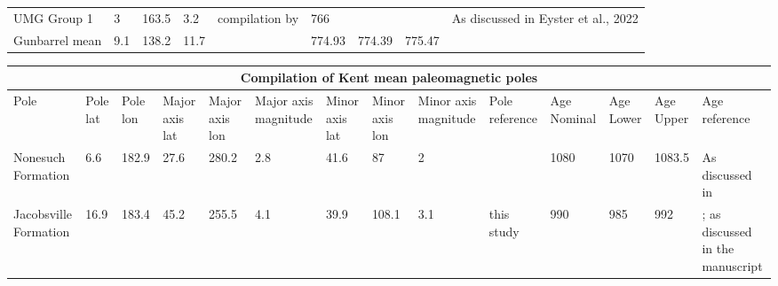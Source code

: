 \documentclass[11pt,letterpaper]{article}
\begin{document}
\begin{table}
\begin{scriptsize}
\begin{tabular}{p{4cm}lllp{4cm}lllp{4cm}}
UMG Group 1                                                & 3        & 163.5    & 3.2  & compilation by \cite{Eyster2019a}                                    & 766        &          &          & As discussed in Eyster et al., 2022                 \\
Gunbarrel mean                                             & 9.1      & 138.2    & 11.7 & \cite{Eyster2019a}                                                   & 774.93     & 774.39   & 775.47   &                                                    
\end{tabular}
\end{scriptsize}
\label{tab:pole_compilation}
\end{table}

\clearpage

\begin{table}
\begin{scriptsize}
\begin{tabular}{p{1.5cm}p{1cm}p{1cm}p{1cm}p{1cm}p{1cm}p{1cm}p{1cm}p{1cm}p{1cm}p{1cm}p{1cm}p{1cm}p{2cm}}
\hline
\multicolumn{14}{c}{Compilation of Kent mean paleomagnetic poles}                                                                                                                                                                                           \\ \hline 
Pole                  & Pole lat & Pole lon & Major axis lat & Major axis lon & Major axis magnitude & Minor axis lat & Minor axis lon & Minor axis magnitude & Pole reference         & Age Nominal & Age Lower & Age Upper & Age reference                                       \\
Nonesuch Formation    & 6.6      & 182.9    & 27.6           & 280.2          & 2.8                  & 41.6           & 87             & 2                    & \cite{Slotznick2023a} & 1080       & 1070     & 1083.5   & As discussed in \cite{Swanson-Hysell2019a}         \\
Jacobsville Formation & 16.9    & 183.4    & 45.2           & 255.5          & 4.1                    & 39.9           & 108.1          & 3.1                  & this study             & 990        & 985      & 992     & \cite{Hodgin2022a}; as discussed in the manuscript
\end{tabular}
\end{scriptsize}
\end{table}

\clearpage



\end{document}
